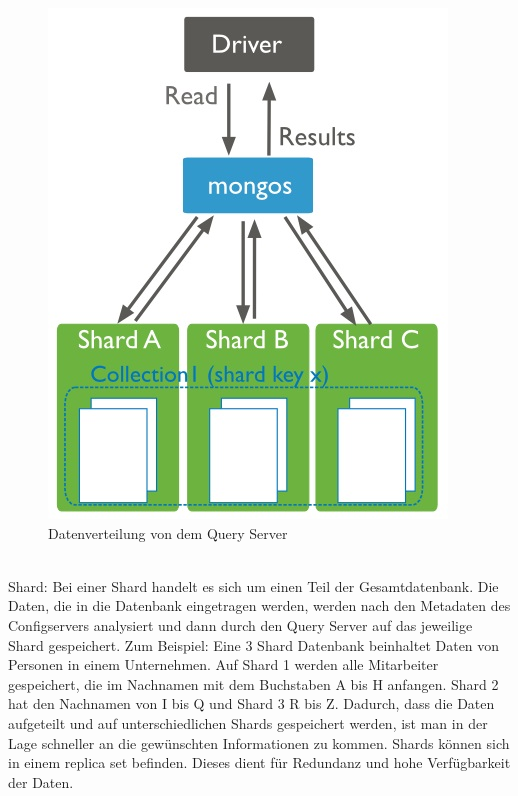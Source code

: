 \begin{figure}
	\centering
	\includegraphics[scale=1]{images/sharded-cluster-scatter-gather-query.jpg} 
	\caption{Datenverteilung von dem Query Server}
\end{figure}
\\
Shard: Bei einer Shard handelt es sich um einen Teil der Gesamtdatenbank. Die Daten, die in die Datenbank eingetragen werden, werden nach den Metadaten des Configservers analysiert und dann durch den Query Server auf das jeweilige Shard gespeichert. Zum Beispiel: Eine 3 Shard Datenbank beinhaltet Daten von Personen in einem Unternehmen. Auf Shard 1 werden alle Mitarbeiter gespeichert, die im Nachnamen mit dem Buchstaben A bis H anfangen. Shard 2 hat den Nachnamen von I bis Q und Shard 3 R bis Z. Dadurch, dass die Daten aufgeteilt und auf unterschiedlichen Shards gespeichert werden, ist man in der Lage schneller an die gewünschten Informationen zu kommen. Shards können sich in einem replica set befinden. Dieses dient für Redundanz  und hohe Verfügbarkeit der Daten.
